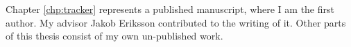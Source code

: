 \authorcontributions



Chapter \ref{chp:tracker} represents a published manuscript, where I am the first author.
My advisor Jakob Eriksson contributed to the writing of it.
Other parts of this thesis consist of my own un-published work.